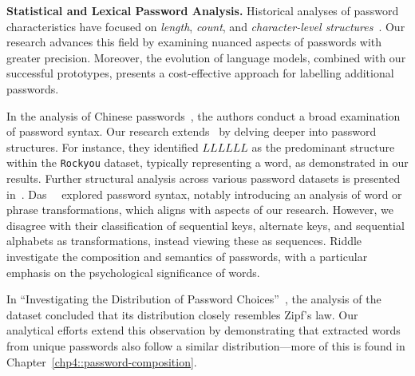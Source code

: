 \textbf{Statistical and Lexical Password Analysis.} Historical analyses of password characteristics have focused on \textit{length}, \textit{count}, and \textit{character-level structures}~\cite{ma_study_2014, Li_Han_Xu_2014, Das_Bonneau_Caesar_Borisov_Wang_2014, ur_et_al_2015, li_study_2016, pearman_et_al_2017, Pasquini_Cianfriglia_Ateniese_Bernaschi_2021, Cazier_Medlin_2006}. Our research advances this field by examining nuanced aspects of passwords with greater precision. Moreover, the evolution of language models, combined with our successful prototypes, presents a cost-effective approach for labelling additional passwords.

In the analysis of Chinese passwords~\cite{Li_Han_Xu_2014}, the authors conduct a broad examination of password syntax. Our research extends~\cite{Li_Han_Xu_2014} by delving deeper into password structures. For instance, they identified $LLLLLL$ as the predominant structure within the \texttt{Rockyou} dataset, typically representing a word, as demonstrated in our results. Further structural analysis across various password datasets is presented in~\cite{li_study_2016}. Das~\etal~\cite{Das_Bonneau_Caesar_Borisov_Wang_2014} explored password syntax, notably introducing an analysis of word or phrase transformations, which aligns with aspects of our research. However, we disagree with their classification of sequential keys, alternate keys, and sequential alphabets as transformations, instead viewing these as sequences. Riddle~\etal~\cite{Riddle_Miron_Semo_1989} investigate the composition and semantics of passwords, with a particular emphasis on the psychological significance of words.

In ``Investigating the Distribution of Password Choices''~\cite{Malone_Maher_2012}, the analysis of the \hmail dataset concluded that its distribution closely resembles Zipf's law. Our analytical efforts extend this observation by demonstrating that extracted words from unique passwords also follow a similar distribution---more of this is found in Chapter~\ref{chp4::password-composition}.

